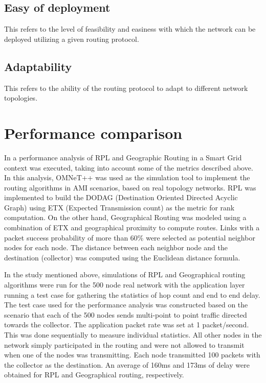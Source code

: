 \documentclass[11pt,draftclsnofoot,onecolumn]{IEEEtran}
\begin{document}
\subsection{Easy of deployment}
This refers to the level of feasibility and easiness with which the network can be deployed utilizing a given routing protocol.  

\subsection{Adaptability}
This refers to the ability of the routing protocol to adapt to different network topologies. 

\section{Performance comparison}

In \cite{Iyer2011a} a performance analysis of RPL and Geographic Routing in a Smart Grid context was executed, taking into account some of the metrics described above. In this analysis,  OMNeT++ was used as the simulation tool to implement the routing algorithms in AMI scenarios, based on real topology networks. RPL was implemented to build the DODAG (Destination Oriented Directed Acyclic Graph) using ETX (Expected Transmission count) as the metric for rank computation. On the other hand, Geographical Routing was modeled using a combination of ETX and geographical proximity to compute routes. Links with a packet success probability of more than 60\% were selected as potential neighbor nodes for each node. The distance between each neighbor node and the destination (collector) was computed using the Euclidean distance formula.  

In the study mentioned above, simulations of RPL and Geographical routing algorithms were run for the 500 node real network with the application layer running a test case for gathering the statistics of hop count and end to end delay. The test case used for the performance analysis was constructed based on the scenario that each of the 500 nodes sends multi-point to point traffic directed towards the collector. The application packet rate was set at 1 packet/second. This was done sequentially to measure individual statistics. All other nodes in the network simply participated in the routing and were not allowed to transmit when one of the nodes was transmitting. Each node transmitted 100 packets with the collector as the destination. An average of 160ms and 173ms of delay were obtained for RPL and Geographical routing, respectively. 
\end{document}
